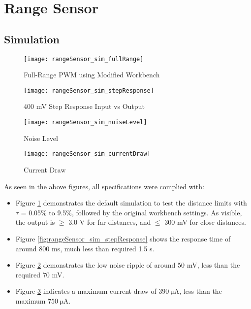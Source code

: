 \graphicspath{{content/3_results/figures}}
\section{Range Sensor}\label{sec:range_sensor_results}

\subsection{Simulation}

\begin{figure}[!htb]
    \centering
    \texttt{[image: rangeSensor\_sim\_fullRange]}
    \caption{Full-Range PWM using Modified Workbench}
    \label{fig:rangeSensor_sim_fullRange}
\end{figure}

\begin{figure}[!h]
    \centering
    \begin{minipage}{0.45\textwidth}
        \centering
        \texttt{[image: rangeSensor\_sim\_stepResponse]}
        \caption{400 mV Step Response Input vs Output}
        \label{fig:rangeSensor_sim_stepResponse}
    \end{minipage}
    \begin{minipage}{0.45\textwidth}
        \centering
        \texttt{[image: rangeSensor\_sim\_noiseLevel]}
        \caption{Noise Level}
        \label{fig:rangeSensor_sim_noiseLevel}
    \end{minipage}
\end{figure}

\begin{figure}[!htb]
    \centering
    \texttt{[image: rangeSensor\_sim\_currentDraw]}
    \caption{Current Draw}
    \label{fig:rangeSensor_sim_currentDraw}
\end{figure}

As seen in the above figures, all specifications were complied with:
\begin{itemize}
    \item Figure \ref{fig:rangeSensor_sim_fullRange} demonstrates the default simulation to test the distance limits with $\tau$ = 0.05\% to 9.5\%,
          followed by the original workbench settings. As visible, the output is $\geq$ 3.0 V for far distances, and $\leq$ 300 mV for close distances.
    \item Figure \ref{fig:rangeSensor_sim_stepResponse} shows the response time of around 800 ms, much less than required 1.5 s.
    \item Figure \ref{fig:rangeSensor_sim_noiseLevel} demonstrates the low noise ripple of around 50 mV, less than the required 70 mV.
    \item Figure \ref{fig:rangeSensor_sim_currentDraw} indicates a maximum current draw of $\SI{390}{\micro\ampere}$, less than the maximum $\SI{750}{\micro\ampere}$.

\end{itemize}

